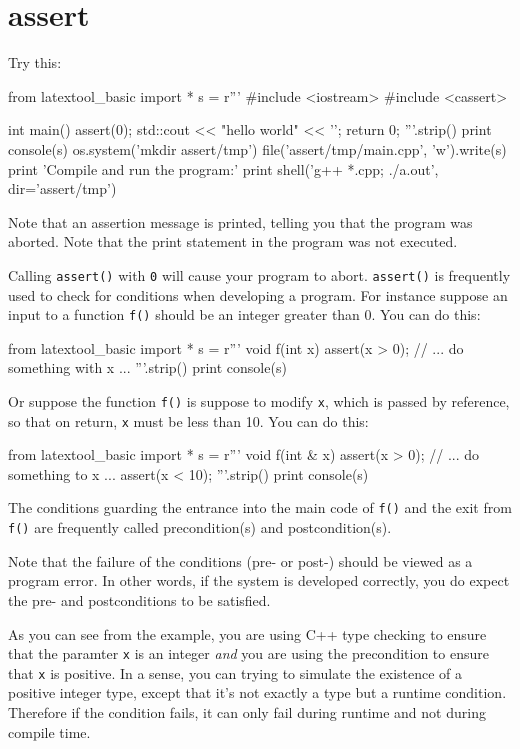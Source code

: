 \section{assert}

Try this:
\begin{python}
from latextool_basic import *
s = r'''
#include <iostream>
#include <cassert>

int main()
{
    assert(0);
    std::cout << "hello world" << '\n';
    return 0;
}
'''.strip()
print console(s)
os.system('mkdir assert/tmp')
file('assert/tmp/main.cpp', 'w').write(s)
print 'Compile and run the program:'
print shell('g++ *.cpp; ./a.out', dir='assert/tmp')
\end{python}
Note that an assertion message is printed, telling you that the program
was aborted.
Note that the print statement in the program was not executed.

Calling \verb!assert()! with \verb!0! will cause
your program to abort.
\verb!assert()! is frequently used 
to check for conditions
when developing a program.
For instance suppose an input to a function \verb!f()! should be 
an integer greater than 0.
You can do this:
\begin{python}
from latextool_basic import *
s = r'''
void f(int x)
{
    assert(x > 0);
    // ... do something with x ...
}
'''.strip()
print console(s)
\end{python}
Or suppose the function \verb!f()! is suppose to modify \verb!x!,
which is passed by reference, so that on return, \verb!x! must be 
less than 10.
You can do this:
\begin{python}
from latextool_basic import *
s = r'''
void f(int & x)
{
    assert(x > 0);
    // ... do something to x ...
    assert(x < 10);   
}
'''.strip()
print console(s)
\end{python}
The conditions guarding the entrance into the main code of \verb!f()!
and the exit from \verb!f()!
are frequently called precondition(s) and postcondition(s).

Note that the failure of the conditions (pre- or post-)
should be viewed as a program error.
In other words, if the system is developed correctly,
you do expect the pre- and postconditions to be satisfied.

As you can see from the example, you are using C++ type checking to 
ensure that the paramter \verb!x! is an integer
\textit{and} you are using the precondition to ensure that 
\verb!x! is positive.
In a sense, you can trying to simulate the existence of a
positive integer type,
except that it's not exactly a type but a runtime condition.
Therefore if
the condition fails, it can only fail during runtime and 
not during compile time.

